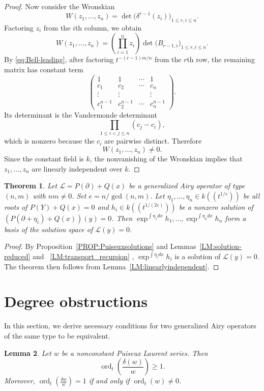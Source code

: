 \documentclass{article}
\newtheorem{theorem}{Theorem}[section]
\newtheorem{lemma}[theorem]{Lemma}
\DeclareMathOperator{\ord}{ord}
\newcommand{\dd}{\delta}
\newcommand{\calL}{{\mathcal{L}}}
\begin{document}
\begin{proof}
Now consider the Wronskian
\[
W(z_1,\ldots,z_n)
=\det\bigl(\delta^{r-1}(z_i)\bigr)_{1\leq r,i\leq n}.
\]
Factoring $z_i$ from the $i$th column, we obtain
\[
W(z_1,\ldots,z_n)
=\left(\prod_{i=1}^n z_i\right)
\det\bigl(B_{r-1,i}\bigr)_{1\leq r,i\leq n}.
\]
By \eqref{eq:Bell-leading}, after factoring
$t^{-(r-1)m/n}$ from the $r$th row, the remaining matrix has constant
term
\[
\begin{pmatrix}
1&1&\cdots&1\\
c_1&c_2&\cdots&c_n\\
\vdots&\vdots&&\vdots\\
c_1^{n-1}&c_2^{n-1}&\cdots&c_n^{n-1}
\end{pmatrix}.
\]
Its determinant is the Vandermonde determinant
\[
\prod_{1\leq i<j\leq n}(c_j-c_i),
\]
which is nonzero because the $c_i$ are pairwise distinct. Therefore
\[
W(z_1,\ldots,z_n)\neq 0.
\]
Since the constant field is $k$, the nonvanishing of the Wronskian implies
that $z_1,\ldots,z_n$ are linearly independent over $k$.
\end{proof}


\begin{theorem}
\label{THM:basisofsolutions}
Let $\calL=P(\partial)+Q(x)$ be a generalized Airy operator of type $(n,m)$ with $nm\neq 0$. Set $e=n/\gcd(n,m)$. Let $\eta_1,\dots,\eta_n\in k((t^{1/e}))$ be all roots of $P(Y)+Q(x)=0$ and $h_i\in k((t^{1/(2e)}))$ be a nonzero solution of $(P(\partial+\eta_i)+Q(x))(y)=0$. Then $\exp^{\int \eta_1 dx}h_1,\dots, \exp^{\int \eta_n dx}h_n$ form a basis of the solution space of $\calL(y)=0$.
\end{theorem}

\begin{proof}
By Proposition~\ref{PROP:Puiseuxsolutions} and Lemmas~\ref{LM:solution-reduced} and ~\ref{LM:transport_recursion}
, $\exp^{\int \eta_i dx} h_i$ is a solution of $\calL(y)=0$. The theorem then follows 
from Lemma~\ref{LM:linearlyindependent}.
\end{proof}


\section{Degree obstructions}
In this section, we derive necessary conditions for two generalized Airy operators
of the same type to be equivalent.
\begin{lemma}
\label{LM:logderivative}
Let $w$ be a nonconstant Puiseux Laurent series.  Then 
$$
 \ord_t\!\left(\frac{\dd (w)}{w}\right)\ge 1.
$$ 
Moreover, 
$\ord_t\!\left(\frac{\dd w}{w}\right)=1$ if and only if $\ord_t(w)\neq 0$.

\end{lemma}
\end{document}
